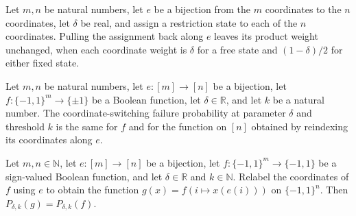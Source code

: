 \begin{theorem}
\label{FABL.restrictionAssignmentWeightAt_reindex}
\leanok
{}
Let $m,n$ be natural numbers, let $e$ be a bijection from the $m$ coordinates to the $n$
coordinates, let $\delta$ be real, and assign a restriction state to each of the $n$
coordinates. Pulling the assignment back along $e$ leaves its product weight unchanged,
when each coordinate weight is $\delta$ for a free state and $(1-\delta)/2$ for either fixed
state.
\end{theorem}

\begin{theorem}
\label{FABL.coordSwitchingFailureProbability_reindexBooleanFunction}
\leanok
{}
Let $m,n$ be natural numbers, let $e:[m]\to[n]$ be a bijection, let
$f:\{-1,1\}^m\to\{\pm1\}$ be a Boolean function, let $\delta\in\mathbb R$, and
let $k$ be a natural number. The coordinate-switching failure probability at parameter
$\delta$ and threshold $k$ is the same for $f$ and for the function on $[n]$ obtained
by reindexing its coordinates along $e$.
\end{theorem}

\begin{theorem}
\label{FABL.switchingFailureProbability_reindexBooleanFunction}
\leanok
{}
Let $m,n\in\mathbb N$, let $e:[m]\to[n]$ be a bijection, let
$f:\{-1,1\}^m\to\{-1,1\}$ be a sign-valued Boolean function, and let
$\delta\in\mathbb R$ and $k\in\mathbb N$. Relabel the coordinates of $f$ using $e$
to obtain the function $g(x)=f(i\mapsto x(e(i)))$ on $\{-1,1\}^n$. Then
$P_{\delta,k}(g)=P_{\delta,k}(f)$.
\end{theorem}

